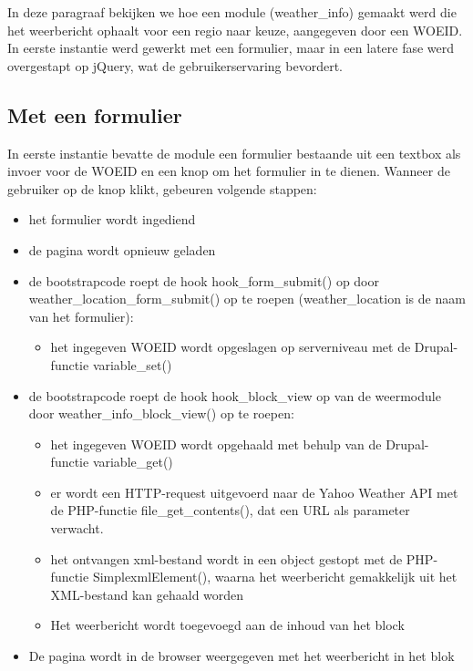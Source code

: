 In deze paragraaf bekijken we hoe een module (weather\_info) gemaakt werd die het weerbericht ophaalt voor een regio naar keuze, aangegeven door een WOEID. In eerste instantie werd gewerkt met een formulier, maar in een latere fase werd overgestapt op jQuery, wat de gebruikerservaring bevordert.

\subsection{Met een formulier}

In eerste instantie bevatte de module een formulier bestaande uit een textbox als invoer voor de WOEID en een knop om het formulier in te dienen.
Wanneer de gebruiker op de knop klikt, gebeuren volgende stappen:

\begin{itemize}
	\item het formulier wordt ingediend
	\item de pagina wordt opnieuw geladen
	\item de bootstrapcode roept de hook hook\_form\_submit() op door weather\_location\_form\_submit() op te roepen (weather\_location is de naam van het formulier):
	\begin{itemize}
		\item het ingegeven WOEID wordt opgeslagen op serverniveau met de Drupal-functie variable\_set()
	\end{itemize}
	\item de bootstrapcode roept de hook hook\_block\_view op van de weermodule door weather\_info\_block\_view() op te roepen:
	\begin{itemize}
		\item het ingegeven WOEID wordt opgehaald met behulp van de Drupal-functie variable\_get()
		\item er wordt een HTTP-request uitgevoerd naar de Yahoo Weather API met de PHP-functie file\_get\_contents(), dat een URL als parameter verwacht.
		\item het ontvangen xml-bestand wordt in een object gestopt met de PHP-functie SimplexmlElement(), waarna het weerbericht gemakkelijk uit het XML-bestand kan gehaald worden
		\item Het weerbericht wordt toegevoegd aan de inhoud van het block
	\end{itemize}
	\item De pagina wordt in de browser weergegeven met het weerbericht in het blok
\end{itemize}

